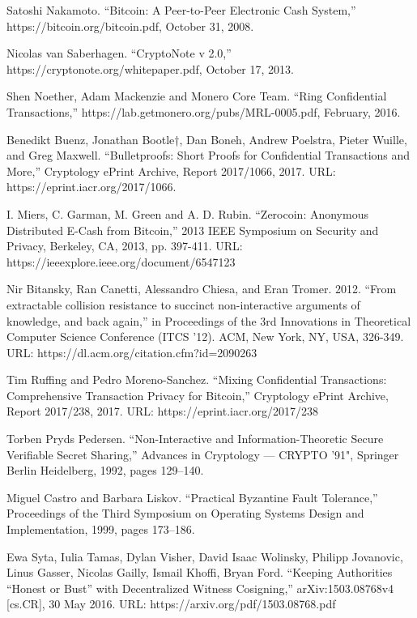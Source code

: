 \documentclass[a4paper, 10pt, conference]{ieeeconf}
\begin{document}
\begin{thebibliography}{99}

 Satoshi Nakamoto. ``Bitcoin: A Peer-to-Peer Electronic Cash System,'' https://bitcoin.org/bitcoin.pdf, October 31, 2008.

 Nicolas van Saberhagen. ``CryptoNote v 2.0,'' https://cryptonote.org/whitepaper.pdf, October 17, 2013.

 Shen Noether, Adam Mackenzie and Monero Core Team. ``Ring Confidential Transactions,'' https://lab.getmonero.org/pubs/MRL-0005.pdf, February, 2016.

 Benedikt Buenz, Jonathan Bootle†, Dan Boneh, Andrew Poelstra, Pieter Wuille, and Greg Maxwell. ``Bulletproofs: Short Proofs for Confidential Transactions and More,'' Cryptology ePrint Archive, Report 2017/1066, 2017. URL: https://eprint.iacr.org/2017/1066.

 I. Miers, C. Garman, M. Green and A. D. Rubin. ``Zerocoin: Anonymous Distributed E-Cash from Bitcoin,'' 2013 IEEE Symposium on Security and Privacy, Berkeley, CA, 2013, pp. 397-411. URL: https://ieeexplore.ieee.org/document/6547123

 Nir Bitansky, Ran Canetti, Alessandro Chiesa, and Eran Tromer. 2012. ``From extractable collision resistance to succinct non-interactive arguments of knowledge, and back again,'' in Proceedings of the 3rd Innovations in Theoretical Computer Science Conference (ITCS '12). ACM, New York, NY, USA, 326-349. URL: https://dl.acm.org/citation.cfm?id=2090263

 Tim Ruffing and Pedro Moreno-Sanchez. ``Mixing Confidential Transactions: Comprehensive Transaction Privacy for Bitcoin,'' Cryptology ePrint Archive, Report 2017/238, 2017. URL: https://eprint.iacr.org/2017/238

 Torben Pryds Pedersen. ``Non-Interactive and Information-Theoretic Secure Verifiable Secret Sharing,'' Advances in Cryptology --- CRYPTO '91", Springer Berlin Heidelberg, 1992, pages 129--140.

 Miguel Castro and Barbara Liskov. ``Practical Byzantine Fault Tolerance,'' Proceedings of the Third Symposium on Operating Systems Design and Implementation, 1999, pages 173--186. 

 Ewa Syta, Iulia Tamas, Dylan Visher, David Isaac Wolinsky, Philipp Jovanovic, Linus Gasser, Nicolas Gailly, Ismail Khoffi, Bryan Ford. ``Keeping Authorities “Honest or Bust” with Decentralized Witness Cosigning,'' arXiv:1503.08768v4 [cs.CR], 30 May 2016. URL: https://arxiv.org/pdf/1503.08768.pdf


\end{thebibliography}
\end{document}
